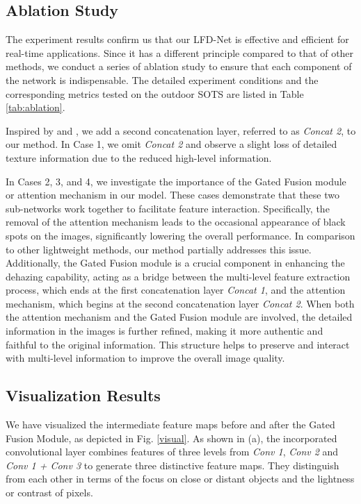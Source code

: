 \documentclass[lettersize,journal]{IEEEtran}
\begin{document}
\subsection{Ablation Study}
The experiment results confirm us that our LFD-Net is effective and efficient for real-time applications. Since it has a different principle compared to that of other methods, we conduct a series of ablation study to ensure that each component of the network is indispensable. The detailed experiment conditions and the corresponding metrics tested on the outdoor SOTS are listed in Table \ref{tab:ablation}. 

Inspired by \cite{li2017aod} and \cite{ullah2021light}, we add a second concatenation layer, referred to as \textit{Concat 2}, to our method. In Case 1, we omit \textit{Concat 2} and observe a slight loss of detailed texture information due to the reduced high-level information. 

In Cases 2, 3, and 4, we investigate the importance of the Gated Fusion module or attention mechanism in our model. These cases demonstrate that these two sub-networks work together to facilitate feature interaction. Specifically, the removal of the attention mechanism leads to the occasional appearance of black spots on the images, significantly lowering the overall performance. In comparison to other lightweight methods, our method partially addresses this issue. Additionally, the Gated Fusion module is a crucial component in enhancing the dehazing capability, acting as a bridge between the multi-level feature extraction process, which ends at the first concatenation layer \textit{Concat 1}, and the attention mechanism, which begins at the second concatenation layer \textit{Concat 2}. When both the attention mechanism and the Gated Fusion module are involved, the detailed information in the images is further refined, making it more authentic and faithful to the original information. This structure helps to preserve and interact with multi-level information to improve the overall image quality.  

\subsection{Visualization Results}
We have visualized the intermediate feature maps before and after the Gated Fusion Module, as  depicted in Fig. \ref{visual}. As shown in (a), the incorporated convolutional layer combines features of three levels from \textit{Conv 1}, \textit{Conv 2} and \textit{Conv 1 + Conv 3} to generate three distinctive feature maps. They distinguish from each other in terms of the focus on close or distant objects and the lightness or contrast of pixels. 
\end{document}
